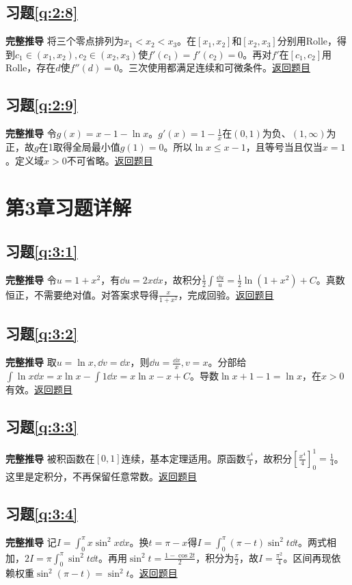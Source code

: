 \subsection*{习题\ref{q:2:8}}\label{a:2:8}\textbf{完整推导} 将三个零点排列为$x_1<x_2<x_3$。在$[x_1,x_2]$和$[x_2,x_3]$分别用Rolle，得到$c_1\in(x_1,x_2),c_2\in(x_2,x_3)$使$f'(c_1)=f'(c_2)=0$。再对$f'$在$[c_1,c_2]$用Rolle，存在$d$使$f''(d)=0$。三次使用都满足连续和可微条件。\quad\hyperref[q:2:8]{返回题目}

\subsection*{习题\ref{q:2:9}}\label{a:2:9}\textbf{完整推导} 令$g(x)=x-1-\ln x$。$g'(x)=1-\frac{1}{x}$在$(0,1)$为负、$(1,\infty)$为正，故$g$在1取得全局最小值$g(1)=0$。所以$\ln x\le x-1$，且等号当且仅当$x=1$。定义域$x>0$不可省略。\quad\hyperref[q:2:9]{返回题目}

\section{第3章习题详解}

\subsection*{习题\ref{q:3:1}}\label{a:3:1}\textbf{完整推导} 令$u=1+x^2$，有$\dd u=2x\dd x$，故积分$\frac12\int\frac{\dd u}{u}=\frac12\ln(1+x^2)+C$。真数恒正，不需要绝对值。对答案求导得$\frac{x}{1+x^2}$，完成回验。\quad\hyperref[q:3:1]{返回题目}

\subsection*{习题\ref{q:3:2}}\label{a:3:2}\textbf{完整推导} 取$u=\ln x,\dd v=\dd x$，则$\dd u=\frac{\dd x}{x},v=x$。分部给$\int\ln x\dd x=x\ln x-\int1\dd x=x\ln x-x+C$。导数$\ln x+1-1=\ln x$，在$x>0$有效。\quad\hyperref[q:3:2]{返回题目}

\subsection*{习题\ref{q:3:3}}\label{a:3:3}\textbf{完整推导} 被积函数在$[0,1]$连续，基本定理适用。原函数$\frac{x^4}{4}$，故积分$[\frac{x^4}{4}]_0^1=\frac{1}{4}$。这里是定积分，不再保留任意常数。\quad\hyperref[q:3:3]{返回题目}

\subsection*{习题\ref{q:3:4}}\label{a:3:4}\textbf{完整推导} 记$I=\int_0^\pi x\sin^2x\dd x$。换$t=\pi-x$得$I=\int_0^\pi(\pi-t)\sin^2t\dd t$。两式相加，$2I=\pi\int_0^\pi\sin^2t\dd t$。再用$\sin^2t=\frac{1-\cos2t}{2}$，积分为$\frac{\pi}{2}$，故$I=\frac{\pi^2}{4}$。区间再现依赖权重$\sin^2(\pi-t)=\sin^2t$。\quad\hyperref[q:3:4]{返回题目}

